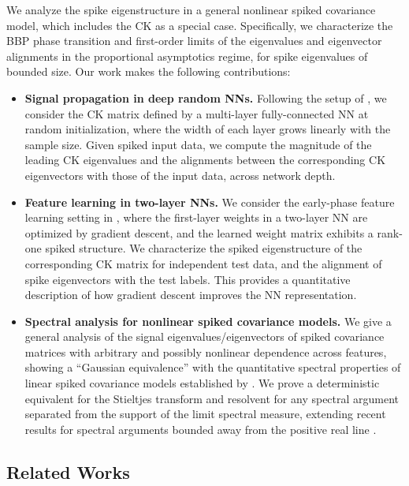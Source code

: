 We analyze the spike eigenstructure in a general nonlinear spiked 
covariance model, which includes the CK as a special case. Specifically, we
characterize the BBP phase transition \citep{baik2005phase} and first-order
limits of the eigenvalues and eigenvector alignments in the proportional
asymptotics regime, for spike eigenvalues of bounded size.
Our work makes the following contributions:
\begin{itemize}[leftmargin=*]
    \item \textbf{Signal propagation in deep random NNs.} Following the setup of
\cite{fan2020spectra}, we consider the CK matrix defined by a multi-layer
fully-connected NN at random initialization, where the width of each layer grows
linearly with the sample size. Given spiked input data, we compute the magnitude
of the leading CK eigenvalues and the alignments between the corresponding CK
eigenvectors with those of the input data, across network depth.
    \item \textbf{Feature learning in two-layer NNs.} We consider the
early-phase feature learning setting in \cite{ba2022high}, where the first-layer
weights in a two-layer NN are optimized by gradient descent, and the learned
weight matrix exhibits a rank-one spiked structure. We characterize the
spiked eigenstructure of the corresponding CK matrix for independent test data,
and the alignment of spike eigenvectors with the test labels.
This provides a quantitative description of how gradient descent improves the NN representation. 
    \item \textbf{Spectral analysis for nonlinear spiked covariance models.} We
give a general analysis of the signal eigenvalues/eigenvectors of spiked
covariance matrices with arbitrary and possibly nonlinear dependence across
features, showing a ``Gaussian equivalence'' with the quantitative spectral
properties of linear spiked covariance models established by
\cite{bai2012sample}. We prove a deterministic equivalent for the Stieltjes
transform and resolvent for any spectral argument separated from the support of
the limit spectral measure,
extending recent results for spectral arguments bounded away from the
positive real line \citep{chouard2022quantitative,chouard2023deterministic,schroder2023deterministic}.
\end{itemize}


\subsection{Related Works}


